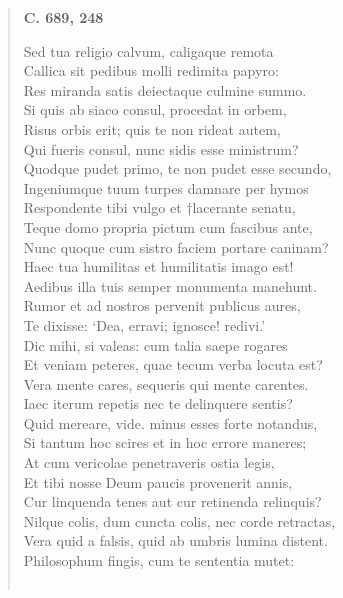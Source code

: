 \documentclass[11pt, a4paper]{report}
\begin{document}
\begin{verse}
     \marginpar{[164]} \begin{center} \textbf{C. 689, 248} \end{center}Sed tua religio calvum, caligaque remota \\ Callica sit pedibus molli redimita papyro: \\ Res miranda satis deiectaque culmine summo. \\ Si quis ab siaco consul, procedat in orbem, \\ Risus orbis erit; quis te non rideat autem, \\ Qui fueris consul, nunc sidis esse ministrum? \\ Quodque pudet primo, te non pudet esse secundo, \\ Ingeniumque tuum turpes damnare per hymos \\ Respondente tibi vulgo et †lacerante senatu, \\ Teque domo propria pictum cum fascibus ante, \\ Nunc quoque cum sistro faciem portare caninam? \\ Haec tua humilitas et humilitatis imago est! \\ Aedibus illa tuis semper monumenta manehunt. \\ Rumor et ad nostros pervenit publicus aures, \\ Te dixisse: ‘Dea, erravi; ignosce! redivi.’ \\ Dic mihi, si valeas: cum talia saepe rogares \\ Et veniam peteres, quae tecum verba locuta est? \\ Vera mente cares, sequeris qui mente carentes. \\ Iaec iterum repetis nec te delinquere sentis? \\ Quid mereare, vide. minus esses forte notandus, \\ Si tantum hoc scires et in hoc errore maneres; \\ At cum vericolae penetraveris ostia legis, \\ Et tibi nosse Deum paucis provenerit annis, \\ Cur linquenda tenes aut cur retinenda relinquis? \\ Nilque colis, dum cuncta colis, nec corde retractas, \\ Vera quid a falsis, quid ab umbris lumina distent. \\ Philosophum fingis, cum te sententia mutet: \\ 
        ﻿\pagebreak 

\end{verse}
\end{document}

